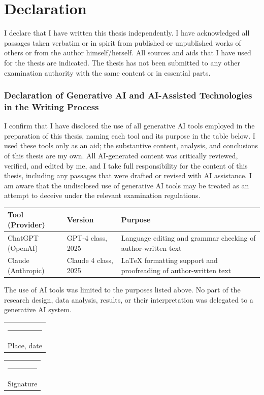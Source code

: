 \chapter*{Declaration}
%
I declare that I have written this thesis independently. I have acknowledged
all passages taken verbatim or in spirit from published or unpublished works
of others or from the author himself\slash herself. All sources and aids that
I have used for the thesis are indicated. The thesis has not been submitted
to any other examination authority with the same content or in essential
parts.

\subsection*{Declaration of Generative AI and AI-Assisted Technologies
             in the Writing Process}
%
I confirm that I have disclosed the use of all generative AI tools employed in
the preparation of this thesis, naming each tool and its purpose in the table
below.  I used these tools only as an aid; the substantive content, analysis,
and conclusions of this thesis are my own.  All AI-generated content was
critically reviewed, verified, and edited by me, and I take full responsibility
for the content of this thesis, including any passages that were drafted or
revised with AI assistance.  I am aware that the undisclosed use of generative
AI tools may be treated as an attempt to deceive under the relevant examination
regulations.

\begin{table}[H]
    \centering
    \renewcommand{\arraystretch}{1.3}
    \begin{tabular}{p{} p{} p{}}
        \hline
        \textbf{Tool (Provider)} & \textbf{Version} & \textbf{Purpose} \\
        \hline
        ChatGPT (OpenAI) & GPT-4 class, 2025 &
        Language editing and grammar checking of author-written text \\

        Claude (Anthropic) & Claude 4 class, 2025 &
        LaTeX formatting support and proofreading of author-written text \\
        \hline
    \end{tabular}
\end{table}

\noindent
The use of AI tools was limited to the purposes listed above.  No part of the
research design, data analysis, results, or their interpretation was delegated
to a generative AI system.

\vspace{2cm}
%
\begin{tabular}{@{}l@{}}%
\rule{0.45\textwidth}{0.4pt}\\
Place, date%
\end{tabular}%
\hfill%
\begin{tabular}{@{}l@{}}%
\rule{0.45\textwidth}{0.4pt}\\
Signature%
\end{tabular}%